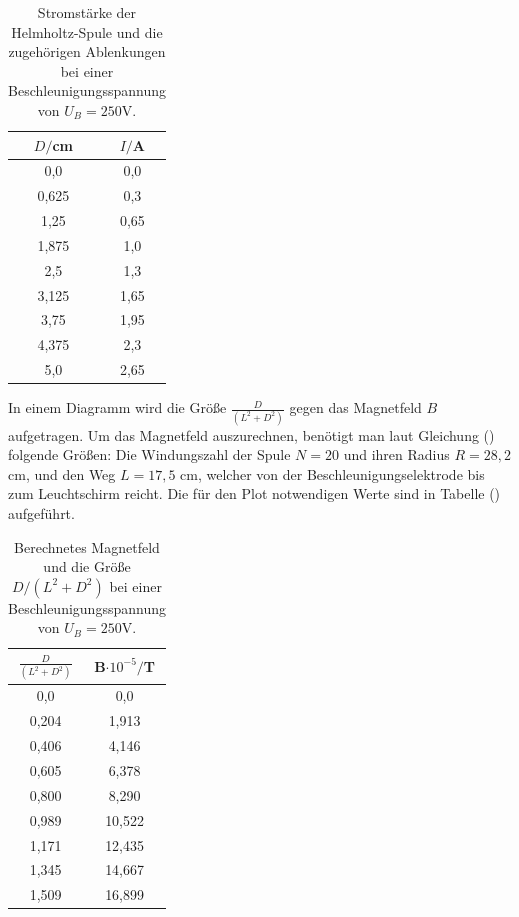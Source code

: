 \begin{table}[H]
  \centering
  \caption{Stromstärke der Helmholtz-Spule und die zugehörigen Ablenkungen bei einer Beschleunigungsspannung von $U_B = 250 \si{\volt}$.}
  \label{tab:Parameter}
  \begin{tabular}{c c}
    \toprule
    $D/$cm& $I/$A \\
    \bottomrule
    0,0 & 0,0 \\
     0,625 & 0,3  \\
     1,25 & 0,65 \\
     1,875 & 1,0  \\
     2,5 & 1,3 \\
     3,125 & 1,65  \\
     3,75& 1,95  \\
     4,375 & 2,3  \\
     5,0 &  2,65 \\
     \bottomrule
  \end{tabular}
\end{table}

\noindent In einem Diagramm wird die Größe $\frac{D}{(L^2+D^2)}$ gegen das Magnetfeld $B$ aufgetragen.
Um das Magnetfeld auszurechnen, benötigt man laut Gleichung () folgende Größen: Die Windungszahl der Spule $N=20$ und ihren Radius $R=28,2$\si{\cm}, und
den Weg $L=17,5$ \si{\cm}, welcher von der Beschleunigungselektrode bis zum Leuchtschirm reicht.
Die für den Plot notwendigen Werte sind in Tabelle () aufgeführt.

\begin{table}[H]
  \centering
  \caption{Berechnetes Magnetfeld und die Größe $D/(L^2+D^2)$ bei einer Beschleunigungsspannung von $U_B = 250 \si{\volt}$.}
  \label{tab:Parameter}
  \begin{tabular}{c c}
    \toprule
    $\frac{D}{(L^2+D^2)}$& $ $B$ \cdot 10^{-5} /$T \\
    \bottomrule
     0,0 & 0,0 \\
     0,204 & 1,913  \\
     0,406 & 4,146 \\
     0,605 & 6,378 \\
     0,800 & 8,290 \\
     0,989 & 10,522  \\
     1,171 & 12,435  \\
     1,345 & 14,667 \\
     1,509 & 16,899 \\
     \bottomrule
  \end{tabular}
\end{table}


